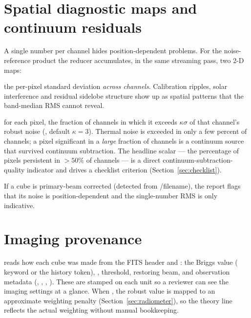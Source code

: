 \documentclass[11pt,a4paper]{article}
\begin{document}
\section{Spatial diagnostic maps and continuum residuals}\label{sec:maps}
A single number per channel hides position-dependent problems. For the
noise-reference product the reducer accumulates, in the same streaming pass, two
2-D maps:
\begin{description}[leftmargin=1.6em,style=nextline]
  \item[Noise map] the per-pixel standard deviation \emph{across channels}.
        Calibration ripples, solar interference and residual sidelobe structure
        show up as spatial patterns that the band-median RMS cannot reveal.
  \item[Continuum-persistence map] for each pixel, the fraction of channels in
        which it exceeds $\kappa\sigma$ of that channel's robust noise
        (, default $\kappa=3$). Thermal noise is exceeded
        in only a few percent of channels; a pixel significant in a \emph{large}
        fraction of channels is a continuum source that survived continuum
        subtraction. The headline scalar --- the percentage of pixels persistent
        in $>50\%$ of channels --- is a direct continuum-subtraction-quality
        indicator and drives a checklist criterion (Section~\ref{sec:checklist}).
\end{description}
If a cube is primary-beam corrected (detected from /filename), the
report flags that its noise is position-dependent and the single-number RMS is
only indicative.

\section{Imaging provenance}\label{sec:provenance}
 reads how each cube was made from the FITS header and
: the Briggs  value ( keyword or the
 history token), , threshold, restoring beam,
and observation metadata (, , ,
). These are stamped on each unit so a reviewer can see the imaging
settings at a glance. When , the robust value is
mapped to an approximate weighting penalty (Section~\ref{sec:radiometer}), so the
theory line reflects the actual weighting without manual bookkeeping.
\end{document}
